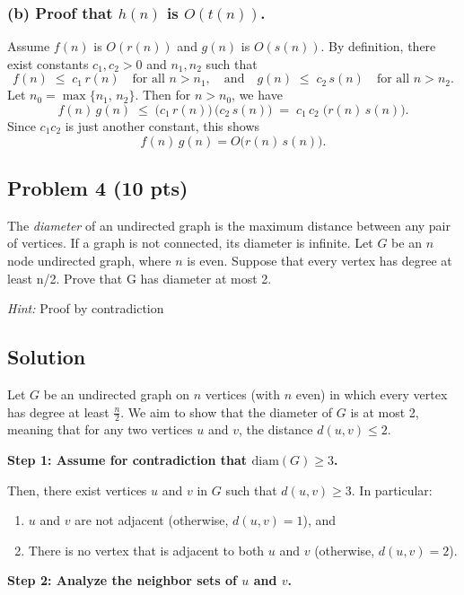\documentclass[12pt]{article}
\begin{document}
\subsubsection*{(b) Proof that $h(n)$ is $O(t(n))$.}

Assume $f(n)$ is $O(r(n))$ and $g(n)$ is $O(s(n))$. By definition, there exist constants $c_1, c_2 > 0$ and $n_1, n_2$ such that
\[
f(n) \;\le\; c_1\,r(n) \quad \text{for all } n > n_1,
\quad\text{and}\quad
g(n) \;\le\; c_2\,s(n) \quad \text{for all } n > n_2.
\]
Let $n_0 = \max\{n_1,\,n_2\}$. Then for $n > n_0$, we have
\[
f(n)\,g(n)
\;\le\;
\bigl(c_1\,r(n)\bigr)\,\bigl(c_2\,s(n)\bigr)
\;=\;
c_1\,c_2\;\bigl(r(n)\,s(n)\bigr).
\]
Since $c_1 c_2$ is just another constant, this shows
\[
f(n)\,g(n) = O\bigl(r(n)\,s(n)\bigr).
\]

\subsection*{Problem 4 (10 pts)}
The \textit{diameter} of an undirected graph is the maximum distance between any pair of vertices. If a graph is not connected, its diameter is infinite. Let $G$ be an $n$ node undirected graph, where $n$ is even. Suppose that every vertex has degree at least n/2. Prove that G has diameter at most 2.

\textit{Hint:} Proof by contradiction

\subsection*{Solution}

Let $G$ be an undirected graph on $n$ vertices (with $n$ even) in which every vertex has degree at least $\frac{n}{2}$. We aim to show that the diameter of $G$ is at most 2, meaning that for any two vertices $u$ and $v$, the distance $d(u,v) \le 2$.

\bigskip
\textbf{Step 1: Assume for contradiction that $\mathrm{diam}(G) \ge 3$.}

Then, there exist vertices $u$ and $v$ in $G$ such that $d(u,v) \ge 3$. In particular:
\begin{enumerate}
    \item $u$ and $v$ are not adjacent (otherwise, $d(u,v)=1$), and 
    \item There is no vertex that is adjacent to both $u$ and $v$ (otherwise, $d(u,v)=2$).
\end{enumerate}

\bigskip
\textbf{Step 2: Analyze the neighbor sets of $u$ and $v$.}
\end{document}
